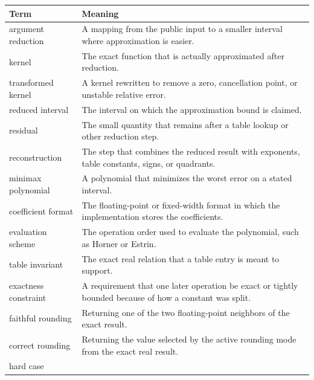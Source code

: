 \documentclass[manuscript, nonacm]{acmart}
\begin{document}
    \begin{table}[H]
        \centering
        \begin{tabular}{p{3.8cm}p{8.5cm}}
            \toprule
            Term & Meaning                                                           \\
            \midrule
            argument reduction
            & A mapping from the public input to a smaller interval where
            approximation is easier. \\
            kernel
            & The exact function that is actually approximated after reduction. \\
            transformed kernel
            & A kernel rewritten to remove a zero, cancellation point, or unstable
            relative error. \\
            reduced interval
            & The interval on which the approximation bound is claimed.         \\
            residual
            & The small quantity that remains after a table lookup or other
            reduction step. \\
            reconstruction
            & The step that combines the reduced result with exponents, table
            constants, signs, or quadrants. \\
            minimax polynomial
            & A polynomial that minimizes the worst error on a stated interval. \\
            coefficient format
            & The floating-point or fixed-width format in which the implementation
            stores the coefficients. \\
            evaluation scheme
            & The operation order used to evaluate the polynomial, such as Horner
            or Estrin. \\
            table invariant
            & The exact real relation that a table entry is meant to support.   \\
            exactness constraint
            & A requirement that one later operation be exact or tightly bounded
            because of how a constant was split. \\
            faithful rounding
            & Returning one of the two floating-point neighbors of the exact
            result. \\
            correct rounding
            & Returning the value selected by the active rounding mode from the
            exact real result. \\
            hard case

\end{tabular}
\end{table}
\end{document}
